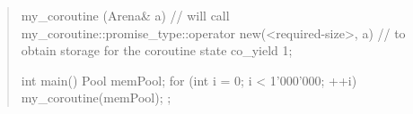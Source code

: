 \begin{quote}
\begin{codeblock}
  my_coroutine (Arena& a) {
    // will call my_coroutine::promise_type::operator new(<required-size>, a)
    // to obtain storage for the coroutine state
    co_yield 1;
  }
  
  int main() {
    Pool memPool;
    for (int i = 0; i < 1'000'000; ++i) my_coroutine(memPool);
  };
\end{codeblock}
\exitexample
\end{quote}